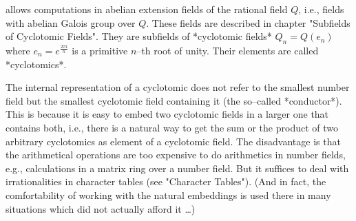 
{\GAP} allows computations in abelian extension fields of the rational
field  $Q$, i.e., fields with  abelian Galois group  over $Q$.   These
fields  are  described  in  chapter "Subfields of Cyclotomic  Fields".
They are subfields  of *cyclotomic fields* $Q_n = Q(e_n)$ where $e_n =
e^{\frac{2\pi i}{n}}$  is a primitive  $n$--th root  of  unity.  Their
elements are called *cyclotomics*.

The  internal representation  of a  cyclotomic  does not refer  to the
smallest number field but the smallest cyclotomic  field containing it
(the so--called *conductor*).  This is because it is easy to embed two
cyclotomic fields in a larger one that contains both, i.e., there is a
natural way to get the sum or the product of two arbitrary cyclotomics
as  element  of a cyclotomic field.   The  disadvantage  is  that  the
arithmetical operations are too expensive to do arithmetics  in number
fields, e.g.,  calculations in a matrix ring over a number field.  But
it  suffices to deal  with irrationalities  in  character  tables (see
"Character Tables").  (And in fact, the comfortability of working with
the natural embeddings is used  there in many situations which did not
actually afford it \ldots)

